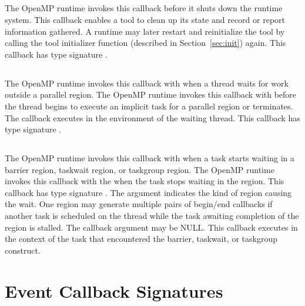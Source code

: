 \subsection{}
The OpenMP runtime invokes this callback before it shuts down the
 runtime system.  This callback enables a tool to clean up its
 state and record or report information gathered. A runtime may later restart and reinitialize the tool by
calling the tool initializer
function (described in Section~\ref{sec:init}) again.
 This callback has type signature .

\subsection{}
  The OpenMP runtime invokes this callback with  when a thread waits for work outside a parallel region.
  The OpenMP runtime invokes this callback with  before the thread  begins to execute an implicit task for
   a parallel region or terminates. The callback executes in the environment of the waiting thread.
  This callback has type signature .

\subsection{}

  The OpenMP runtime invokes this callback with  when a task starts waiting in a barrier region, taskwait region, or taskgroup region.
   The OpenMP runtime invokes this callback with the  when the task stops waiting in the region.
  This callback has type signature .
   The argument  indicates the kind of region causing the wait.
   One region may generate multiple pairs of begin/end callbacks if another task is scheduled on the thread while the task awaiting completion of the region is stalled.
   The callback argument  may be NULL.
   This callback executes in the context of the task that encountered the barrier, taskwait, or taskgroup construct.


\section{Event Callback Signatures}
\label{sec:ToolsSupport_callback_signatures}

